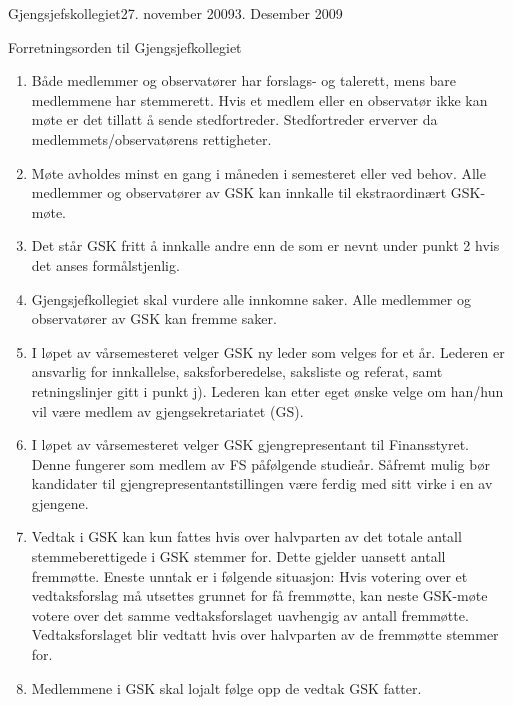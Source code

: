 \begin{instruks}{Gjengsjefskollegiet}{27. november 2009}{3. Desember 2009}
    \begin{instruksledd}{Forretningsorden til Gjengsjefkollegiet}
        \begin{enumerate}
            \item Både medlemmer og observatører har forslags- og talerett, mens bare medlemmene
                har stemmerett. Hvis et
                medlem eller en observatør ikke kan møte er det tillatt å sende stedfortreder.
                Stedfortreder erverver da
                medlemmets/observatørens rettigheter.
            \item Møte avholdes minst en gang i måneden i semesteret eller ved behov. Alle
                medlemmer og observatører av
                GSK kan innkalle til ekstraordinært GSK-møte.
            \item Det står GSK fritt å innkalle andre enn de som er nevnt under punkt 2 hvis det
                anses formålstjenlig.
            \item Gjengsjefkollegiet skal vurdere alle innkomne saker. Alle medlemmer og
                observatører av GSK kan fremme
                saker.
            \item I løpet av vårsemesteret velger GSK ny leder som velges for et år. Lederen er
                ansvarlig for innkallelse,
                saksforberedelse, saksliste og referat, samt retningslinjer gitt i punkt j).
                Lederen kan etter eget ønske velge
                om han/hun vil være medlem av gjengsekretariatet (GS).
            \item
                I løpet av vårsemesteret velger GSK gjengrepresentant til Finansstyret. Denne
                fungerer som medlem av FS
                påfølgende studieår. Såfremt mulig bør kandidater til gjengrepresentantstillingen
                være ferdig med sitt virke i
                en av gjengene.
            \item Vedtak i GSK kan kun fattes hvis over halvparten av det totale antall
                stemmeberettigede i GSK stemmer for.
                Dette gjelder uansett antall fremmøtte. Eneste unntak er i følgende situasjon:
                Hvis votering over et
                vedtaksforslag må utsettes grunnet for få fremmøtte, kan neste GSK-møte votere
                over det samme
                vedtaksforslaget uavhengig av antall fremmøtte. Vedtaksforslaget blir vedtatt hvis
                over halvparten av de
                fremmøtte stemmer for.
            \item Medlemmene i GSK skal lojalt følge opp de vedtak GSK fatter.

\end{enumerate}
\end{instruksledd}
\end{instruks}
